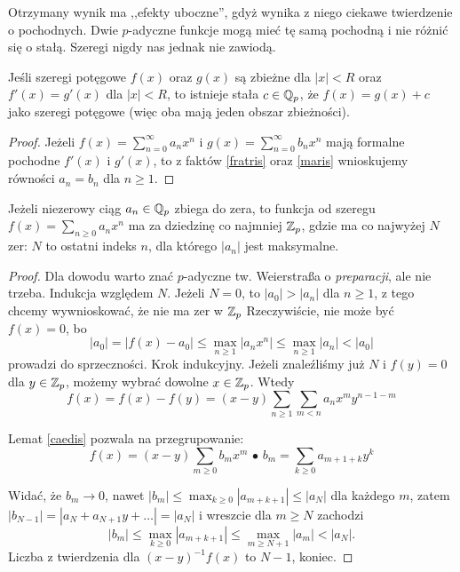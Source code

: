 Otrzymany wynik ma ,,efekty uboczne'', gdyż wynika z niego ciekawe twierdzenie o pochodnych.
Dwie $p$-adyczne funkcje mogą mieć tę samą pochodną i nie różnić się o stałą.
Szeregi nigdy nas jednak nie zawiodą.

\begin{fakt}
	Jeśli szeregi potęgowe $f(x)$ oraz $g(x)$ są zbieżne dla $|x| < R $ oraz $f'(x) = g'(x)$ dla $|x| < R $, to istnieje stała $c \in \mathbb Q_p$, że $f(x) = g(x) + c$ jako szeregi potęgowe (więc oba mają jeden obszar zbieżności). 
\end{fakt}

\begin{proof}
	Jeżeli $f(x) = \sum_{n = 0}^\infty a_n x^n$ i $g(x) = \sum_{n = 0}^\infty b_n x^n$ mają formalne pochodne $f'(x)$ i $g'(x)$, to z faktów \ref{fratris} oraz \ref{maris} wnioskujemy równości $a_n = b_n$ dla $n \ge 1$.
\end{proof}

\begin{twierdzenie}[Strassman, 1928]
	Jeżeli niezerowy ciąg $a_n \in \mathbb Q_p$ zbiega do zera, to funkcja od szeregu $f(x) = \sum_{n \ge 0} a_n x^n$ ma za dziedzinę co najmniej $\mathbb Z_p$, gdzie ma co najwyżej $N$ zer: $N$ to ostatni indeks $n$, dla którego $|a_n|$ jest maksymalne.
\end{twierdzenie}

\begin{proof}
	Dla dowodu warto znać $p$-adyczne tw. Weierstraßa o \emph{preparacji}, ale nie trzeba.
	Indukcja względem $N$.
	Jeżeli $N = 0$, to $|a_0| > |a_n|$ dla $n \ge 1$, z tego chcemy wywnioskować, że nie ma zer w $\mathbb Z_p$
	Rzeczywiście, nie może być $f(x) = 0$, bo
	\[
		|a_0| = |f(x) - a_0| \le \max_{n \ge 1}|a_nx^n| \le \max_{n \ge 1} |a_n| < |a_0|
	\]
	prowadzi do sprzeczności.
	Krok indukcyjny.
	Jeżeli znaleźliśmy już $N$ i $f(y) = 0$ dla $y \in \mathbb Z_p$, możemy wybrać dowolne $x \in \mathbb Z_p$.
	Wtedy
	\[
		f(x) = f(x) - f(y) = (x-y) \sum_{n \ge 1} \sum_{m < n} a_n x^m y^{n-1-m}
	\]

	Lemat \ref{caedis} pozwala na przegrupowanie:
	\[
		f(x) = (x - y) \sum_{m \ge 0} b_m x^m \,\bullet\,
		b_m = \sum_{k \ge 0} a_{m+1+k} y^k
	\]
	
	Widać, że $b_m \to 0$, nawet $|b_m| \le \max_{k \ge 0} |a_{m+k+1}| \le |a_N|$ dla każdego $m$, zatem $|b_{N-1}| = |a_N + a_{N+1} y + \dots| = |a_N|$ i wreszcie dla $m \ge N$ zachodzi
	\[
		|b_m| \le \max_{k \ge 0}|a_{m+k+1}| \le \max_{m \ge N+1} |a_m| < |a_N|.
	\]
	Liczba z twierdzenia dla $(x-y)^{-1}f(x)$ to $N-1$, koniec.
\end{proof}

